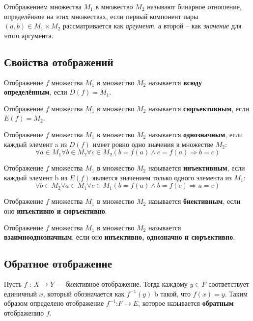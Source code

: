 \documentclass[a4paper]{article}
\begin{document}
    Отображением
    множества $M_1$ в множество $M_2$ называют бинарное отношение, определённое на
    этих множествах, если первый компонент пары $(a, b) \in M_1 \times M_2$ рассматривается как \textit{аргумент}, а второй – как \textit{значение} для этого аргумента.

    \subsection*{Свойства отображений}

    Отображение $f$ множества $M_1$ в множество $M_2$ называется
    \textbf{всюду определённым}, если $D(f) = M_1$.

    Отображение $f$ множества $M_1$ в множество $M_2$ называется
    \textbf{сюръективным}, если $E(f) = M_2$.

    Отображение $f$ множества $M_1$ в множество $M_2$ называется
    \textbf{однозначным}, если каждый элемент a из $D(f)$ имеет ровно одно значения в множестве $M_2$:
    \begin{equation}
        \forall a \in M_1 \forall b \in M_2 \forall c \in M_2 (b  = f(a) \land c = f(a) \Rightarrow b = c)
    \end{equation}


    Отображение $f$ множества $M_1$ в множество $M_2$ называется
    \textbf{инъективным}, если каждый элемент b из $E(f)$ является значением только одного элемента из $M_1$:
    \begin{equation}
        \forall b \in M_2 \forall a \in M_1 \forall c \in M_1 (b = f(a) \land b = f(c) \Rightarrow a = c)
    \end{equation}

    Отображение $f$ множества $M_1$ в множество $M_2$ называется
    \textbf{биективным}, если оно \textbf{инъективно и сюръективно}.

    Отображение $f$ множества $M_1$ в множество $M_2$ называется
    \textbf{взаимнооднозначным}, если оно \textbf{инъективно, однозначно и сюръективно}.

    \subsection*{Обратное отображение
    }
    Пусть $f$ : $X \rightarrow Y$ --- биективное отображение. Тогда каждому $y \in F$ соответствует единичный $x$, который обозначается как $f^{-1} (y)$ b такой, что $f(x) = y$. Таким образом определено отображение $f^{-1}$:$F \rightarrow E$, которое называется \textbf{обратным} отображению $f$.
\end{document}
